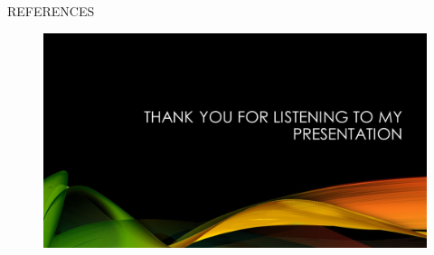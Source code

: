 \documentclass[unknownkeysallowed, compress]{beamer}
\theoremstyle{plain}
\begin{document}








\begin{frame}[allowframebreaks]{REFERENCES}

\nocite{*}

\end{frame}
\begin{frame}
   \begin{figure}[hp]
	\centering
		\includegraphics[width=1.00\textwidth]{image2.jpg}
\end{figure}
\end{frame}
\end{document}
